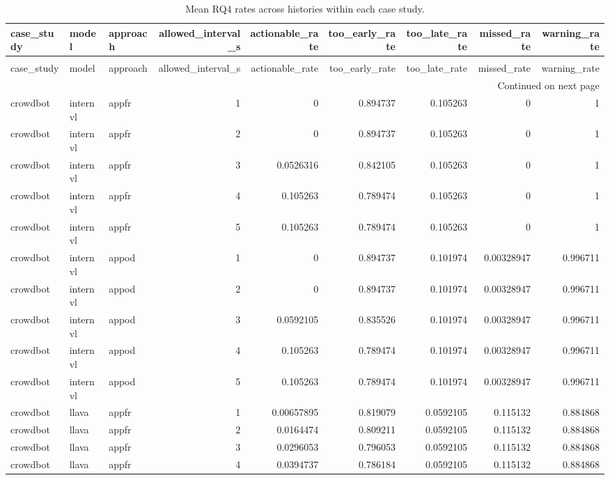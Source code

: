 \begin{longtable}{lllrrrrrr}
\caption{Mean RQ4 rates across histories within each case study.} \label{tab:rq4-case-study-warning-profile} \\
\toprule
case\_study & model & approach & allowed\_interval\_s & actionable\_rate & too\_early\_rate & too\_late\_rate & missed\_rate & warning\_rate \\
\midrule
\endfirsthead
\caption[]{Mean RQ4 rates across histories within each case study.} \\
\toprule
case\_study & model & approach & allowed\_interval\_s & actionable\_rate & too\_early\_rate & too\_late\_rate & missed\_rate & warning\_rate \\
\midrule
\endhead
\midrule
\multicolumn{9}{r}{Continued on next page} \\
\midrule
\endfoot
\bottomrule
\endlastfoot
crowdbot & internvl & appfr & 1 & 0 & 0.894737 & 0.105263 & 0 & 1 \\
crowdbot & internvl & appfr & 2 & 0 & 0.894737 & 0.105263 & 0 & 1 \\
crowdbot & internvl & appfr & 3 & 0.0526316 & 0.842105 & 0.105263 & 0 & 1 \\
crowdbot & internvl & appfr & 4 & 0.105263 & 0.789474 & 0.105263 & 0 & 1 \\
crowdbot & internvl & appfr & 5 & 0.105263 & 0.789474 & 0.105263 & 0 & 1 \\
crowdbot & internvl & appod & 1 & 0 & 0.894737 & 0.101974 & 0.00328947 & 0.996711 \\
crowdbot & internvl & appod & 2 & 0 & 0.894737 & 0.101974 & 0.00328947 & 0.996711 \\
crowdbot & internvl & appod & 3 & 0.0592105 & 0.835526 & 0.101974 & 0.00328947 & 0.996711 \\
crowdbot & internvl & appod & 4 & 0.105263 & 0.789474 & 0.101974 & 0.00328947 & 0.996711 \\
crowdbot & internvl & appod & 5 & 0.105263 & 0.789474 & 0.101974 & 0.00328947 & 0.996711 \\
crowdbot & llava & appfr & 1 & 0.00657895 & 0.819079 & 0.0592105 & 0.115132 & 0.884868 \\
crowdbot & llava & appfr & 2 & 0.0164474 & 0.809211 & 0.0592105 & 0.115132 & 0.884868 \\
crowdbot & llava & appfr & 3 & 0.0296053 & 0.796053 & 0.0592105 & 0.115132 & 0.884868 \\
crowdbot & llava & appfr & 4 & 0.0394737 & 0.786184 & 0.0592105 & 0.115132 & 0.884868 \\

\end{longtable}
